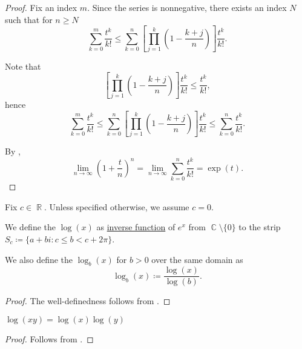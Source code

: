 \begin{proof}
  Fix an index \( m \). Since the series is nonnegative, there exists an index \( N \) such that for \( n \geq N \)
  \begin{equation*}
    \sum_{k=0}^m \frac {t^k} {k!}
    \leq
    \sum_{k=0}^n \left[ \prod_{j=1}^k \left(1 - \frac {k+j} n \right) \right] \frac {t^k} {k!}.
  \end{equation*}

  Note that
  \begin{equation*}
    \left[ \prod_{j=1}^k \left(1 - \frac {k+j} n \right) \right] \frac {t^k} {k!}
    \leq
    \frac {t^k} {k!},
  \end{equation*}
  hence
  \begin{equation*}
    \sum_{k=0}^m \frac {t^k} {k!}
    \leq
    \sum_{k=0}^n \left[ \prod_{j=1}^k \left(1 - \frac {k+j} n \right) \right] \frac {t^k} {k!}
    \leq
    \sum_{k=0}^n \frac {t^k} {k!}.
  \end{equation*}

  By ,
  \begin{equation*}
    \lim_{n \to \infty} \left(1 + \frac t n \right)^n
    =
    \lim_{n \to \infty} \sum_{k=0}^n \frac {t^k} {k!}
    =
    \exp(t).
  \end{equation*}
\end{proof}

\begin{definition}\label{def:logarithm}
  Fix \( c \in \BbbR \). Unless specified otherwise, we assume \( c = 0 \).

  We define the  \( \log(x) \) as \hyperref[def:function/inverse]{inverse function} of \( e^x \) from \( \BbbC \setminus \{ 0 \} \) to the strip \( S_c \coloneqq \{ a + bi \colon c \leq b < c + 2\pi \} \).

  We also define the  \( \log_b(x) \) for \( b > 0 \) over the same domain as
  \begin{equation*}
    \log_b(x) \coloneqq \frac {\log(x)} {\log(b)}.
  \end{equation*}
\end{definition}
\begin{proof}
  The well-definedness follows from .
\end{proof}

\begin{proposition}\label{thm:logarithm_properties}
  \hfill
  \begin{thmenum}
     \( \log(xy) = \log(x) \log(y) \)
  \end{thmenum}
\end{proposition}
\begin{proof}
   Follows from .
\end{proof}

